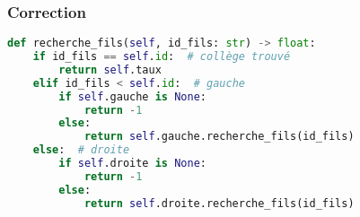 \documentclass[svgnames,11pt]{beamer}
\begin{document}
\begin{frame}[fragile]
    \frametitle{Correction}

\begin{center}
\begin{lstlisting}[language=Python , basicstyle=\ttfamily\small, xleftmargin=.5em, xrightmargin=-1em]
def recherche_fils(self, id_fils: str) -> float:
    if id_fils == self.id:  # collège trouvé
        return self.taux
    elif id_fils < self.id:  # gauche
        if self.gauche is None:
            return -1
        else:
            return self.gauche.recherche_fils(id_fils)
    else:  # droite
        if self.droite is None:
            return -1
        else:
            return self.droite.recherche_fils(id_fils)
\end{lstlisting}
\end{center}    

\end{frame}
\end{document}
